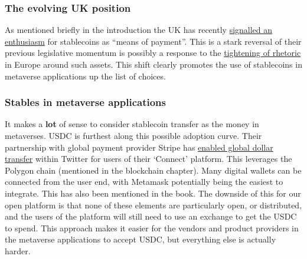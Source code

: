 

  




\subsubsection{The evolving UK position}
As mentioned briefly in the introduction the UK has recently \href{https://www.gov.uk/government/news/government-sets-out-plan-to-make-uk-a-global-cryptoasset-technology-hub}{signalled an enthusiasm} for stablecoins as ``means of payment''. This is a stark reversal of their previous legislative momentum is possibly a response to the \href{https://www.coindesk.com/policy/2022/05/11/eu-commission-favors-ban-on-large-scale-stablecoins-document-shows/}{tightening of rhetoric} in Europe around such assets. This shift clearly promotes the use of stablecoins in metaverse applications up the list of choices. 
\subsubsection{Stables in metaverse applications}
It makes a \textbf{lot} of sense to consider stablecoin transfer as the money in metaverses. USDC is furthest along this possible adoption curve. Their partnership with global payment provider Stripe has \href{https://stripe.com/blog/expanding-global-payouts-with-crypto}{enabled global dollar transfer} within Twitter for users of their `Connect' platform. This leverages the Polygon chain (mentioned in the blockchain chapter). Many digital wallets can be connected from the user end, with Metamask potentially being the easiest to integrate. This has also been mentioned in the book. The downside of this for our open platform is that none of these elements are particularly open, or distributed, and the users of the platform will still need to use an exchange to get the USDC to spend. This approach makes it easier for the vendors and product providers in the metaverse applications to accept USDC, but everything else is actually harder.

